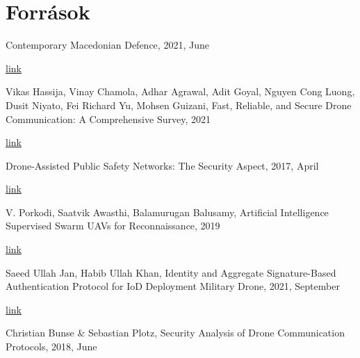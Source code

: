 \documentclass{article}
\begin{document}
\section{Források}

\begin{flushleft}

Contemporary Macedonian Defence, 2021, June

\href{https://d1wqtxts1xzle7.cloudfront.net/72008152/Sovremena_Makedonska_Odbrana_br.40_en_2_-libre.pdf?1633795839=&response-content-disposition=inline%3B+filename%3DGREAT_BRITAIN_S_EXIT_FROM_THE_EU_BREXIT.pdf&Expires=1670532548&Signature=XdeR1thXJwZKficBvz4kdmL293VKzFvY7FDccbf65f8nLW2bOAqNZ7-qkc0y2wA1x6iE3LW9xF-xhDdhLu1lPU-B2STv62O4-KhOR5iXWdxrWibulCv4Mgy-jNi58CfCPbQ9VLtCZjW6XKu04kPXjzSpQAg61Ka8GzEJCOYe8We3GURPW9VHWiUXDaoelwsPeUEFCT00QS3q5fRA6wCheY~0JGEZR5vaY3qmlv9EMOoWE5O44Q88phDsSMw2fRlI~7fot0y4OH286eKjDtUPzUk6swKnSfAVV2HFWrLWqVv14fgZzGmpxN~llqoTxrOkmhDLCRjkQsoLDqs6Mu3UpA__&Key-Pair-Id=APKAJLOHF5GGSLRBV4ZA#page=118}{link}

\bigskip

Vikas Hassija, Vinay Chamola, Adhar Agrawal, Adit Goyal, Nguyen Cong Luong, Dusit Niyato, Fei Richard Yu, Mohsen Guizani, Fast, Reliable, and Secure Drone Communication: A Comprehensive Survey, 2021

\href{https://ieeexplore.ieee.org/abstract/document/9488323/authors#authors}{link}

\bigskip

Drone-Assisted Public Safety Networks: The Security Aspect, 2017, April

\href{https://link.springer.com/chapter/10.1007/978-981-15-5827-6_33}{link}

\bigskip

V. Porkodi, Saatvik Awasthi, Balamurugan Balusamy, Artificial Intelligence Supervised Swarm UAVs for Reconnaissance, 2019

\href{https://link.springer.com/chapter/10.1007/978-981-15-5827-6_33}{link}

\bigskip

Saeed Ullah Jan, Habib Ullah Khan, Identity and Aggregate Signature-Based Authentication Protocol for IoD Deployment Military Drone, 2021, September

\href{https://ieeexplore.ieee.org/abstract/document/9530542}{link}

\bigskip


Christian Bunse \& Sebastian Plotz, Security Analysis of Drone Communication Protocols, 2018, June


\end{flushleft}
\end{document}
